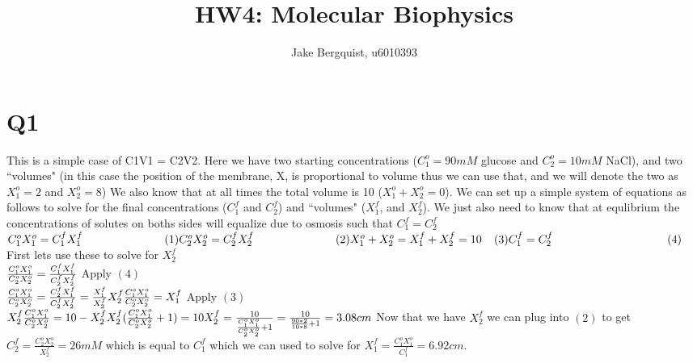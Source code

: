 \documentclass[12pt]{article}
\begin{document}
	
	


\title{HW4: Molecular Biophysics}
\author{Jake Bergquist, u6010393 }
\maketitle

\section{Q1}
This is a simple case of C1V1 = C2V2. Here we have two starting concentrations ($C_1^o = 90 mM$ glucose and $C_2^o = 10 mM$ NaCl), and two ``volumes" (in this case the position of the membrane, X, is proportional to volume thus we can use that, and we will denote the two as $X_1^o=2$ and $X_2^o = 8$) We also know that at all times the total volume is 10 ($X_1^o + X_2^o = 0$). We can set up a simple system of equations as follows to solve for the final concentrations ($C_1^f$ and $C_2^f$) and ``volumes" ($X_1^f$, and $X_2^f$). We just also need to know that at equlibrium the concentrations of solutes on boths sides will equalize due to osmosis such that $C_1^f = C_2^f$\\
$
C_1^oX_1^o = C_1^fX_1^f\hspace{1in}(1)\\
C_2^oX_2^o = C_2^fX_2^f\hspace{1in}(2)\\
X_1^o + X_2^o = X_1^f + X_2^f = 10\hspace{0.151in}(3)\\
C_1^f = C_2^f\hspace{1.4in}(4)\\
$
First lets use these to solve for $X_2^f$\\
$
\frac{C_1^oX_1^o}{C_2^oX_2^o} = \frac{C_1^fX_1^f}{C_2^fX_2^f}\\
$
Apply $(4)$\\
$
\frac{C_1^oX_1^o}{C_2^oX_2^o} = \frac{C_2^fX_1^f}{C_2^fX_2^f} = \frac{X_1^f}{X_2^f}\\
X_2^f\frac{C_1^oX_1^o}{C_2^oX_2^o} = X_1^f\\
$
Apply $(3)$\\
$
X_2^f\frac{C_1^oX_1^o}{C_2^oX_2^o} = 10-X_2^f\\
X_2^f(\frac{C_1^oX_1^o}{C_2^oX_2^o}+1) = 10\\
X_2^f = \frac{10}{\frac{C_1^oX_1^o}{C_2^oX_2^o}+1} = \frac{10}{\frac{90*2}{10*8}+1} = 3.08 cm
$
Now that we have $X_2^f$ we can plug into $(2)$ to get $C_2^f = \frac{C_2^oX_2^o}{X_2^f} = 26 mM$ which is equal to $C_1^f$ which we can used to solve for $X_1^f = \frac{C_1^oX_1^o}{C_1^f} = 6.92 cm$.\\
\end{document}
